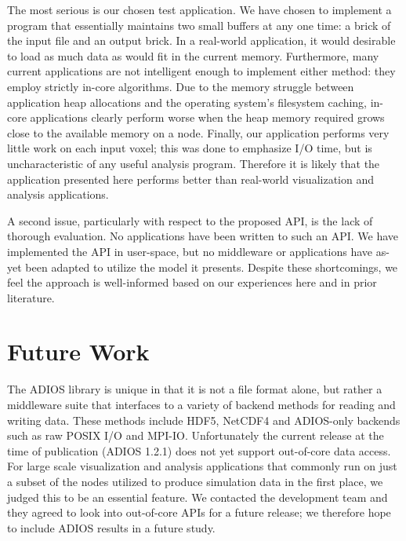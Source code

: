 The most serious is our chosen test application.  We have chosen to
implement a program that essentially maintains two small buffers
at any one time: a brick of the input file and an output brick.
In a real-world application, it would desirable to load as much
data as would fit in the current memory.  Furthermore, many current
applications are not intelligent enough to implement either method:
they employ strictly in-core algorithms.  Due to the memory struggle
between application heap allocations and the operating system's
filesystem caching, in-core applications clearly perform worse when the
heap memory required grows close to the available memory on a node.
Finally, our application performs very little work on each input voxel;
this was done to emphasize I/O time, but is uncharacteristic of any
useful analysis program.
Therefore it is likely that the application presented here performs
better than real-world visualization and analysis applications.

A second issue, particularly with respect to the proposed API, is
the lack of thorough evaluation.  No applications have been written
to such an API.  We have implemented the API in user-space, but no
middleware or applications have as-yet been adapted to utilize the
model it presents.  Despite these shortcomings, we feel the approach is
well-informed based on our experiences here and in prior literature.

\section{Future Work}

The ADIOS library is unique in that it is not a file format alone,
but rather a middleware suite that interfaces to a variety of backend
methods for reading and writing data.  These methods include HDF5,
NetCDF4 and ADIOS-only backends such as raw POSIX I/O and MPI-IO.
Unfortunately the current release at the time of publication (ADIOS
1.2.1) does not yet support out-of-core data access.  For large scale
visualization and analysis applications that commonly run on just a
subset of the nodes utilized to produce simulation data in the first
place, we judged this to be an essential feature.  We contacted the
development team and they agreed to look into out-of-core APIs for a
future release; we therefore hope to include ADIOS results in a future
study.

